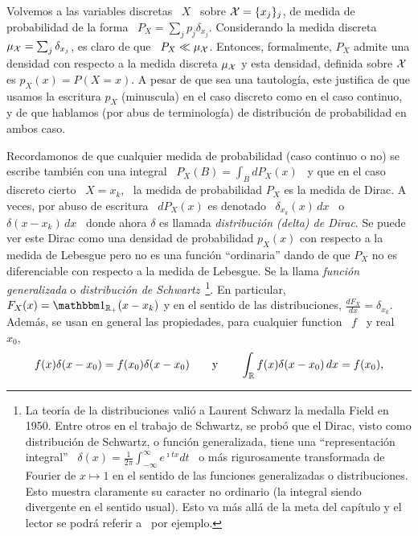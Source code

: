 Volvemos a las variables  discretas \ $X$ \ sobre $\mathcal{X} =  \{ x_j \}_j$, de medida
de probabilidad de la forma \  $P_X = \sum_j p_j \delta_{x_j}$.  Considerando la
medida discreta  \ $\mu_{\mathcal{X}} =  \sum_j \delta_{x_j}$, es  claro de que \  $P_X \ll
\mu_{\mathcal{X}}$.   Entonces, formalmente,  $P_X$ admite  una densidad  con respecto  a la
medida discreta $\mu_{\mathcal{X}}$ y esta densidad, definida sobre $\mathcal{X}$ es $p_X(x) = P(X =
x)$.  A pesar  de que  sea una  tautolog\'ia, este  justifica de  que  usamos la
escritura $p_X$ (minuscula)  en el caso discreto como en el  caso continuo, y de
que hablamos (por  abus de terminolog\'ia) de distribuci\'on  de probabilidad en
ambos caso.\label{Pagina:MP:DensidadDiscreta}

Recordamonos de  que cualquier  medida de probabilidad  (caso continuo o  no) se
escribe tambi\'en con una integral \ $\displaystyle P_X(B) = \int_B dP_X(x)$ \ y
que en el caso discreto cierto \ $X = x_k$, \ la medida de probabilidad $P_X$ es
la medida de  Dirac. A veces, por  abuso de escritura \ $dP_X(x)$  es denotado \
$\delta_{x_k}(x) \,  dx$ \ o \ $\delta(x-x_k)  \, dx$ \ donde  ahora $\delta$ es
llamada {\it distribuci\'on (delta) de Dirac}.  Se puede ver este Dirac como una
densidad de probabilidad $p_X(x)$ con respecto a la medida de Lebesgue pero no es
una funci\'on ``ordinaria'' dando de que $P_X$ no es diferenciable con respecto a
la  medida  de  Lebesgue.  Se  la  llama  {\it  funci\'on generalizada}  o  {\it
  distribuci\'on de Schwartz}~\footnote{La teor\'ia de la distribuciones vali\'o
  a Laurent  Schwarz la  medalla Field en  1950.  Entre  otros en el  trabajo de
  Schwartz, se  prob\'o que el Dirac,  visto como distribuci\'on  de Schwartz, o
  funci\'on   generalizada,   tiene    una   ``representaci\'on   integral''   \
  $\displaystyle \delta(x) =  \frac{1}{2\pi} \int_{-\infty}^{\infty} e^{\imath t
    x} dt$ \  o m\'as rigurosamente transformada de Fourier de  $x \mapsto 1$ en
  el  sentido de  las  funciones generalizadas  o  distribuciones.  Esto  muestra
  claramente  su caracter  no ordinario  (la  integral siendo  divergente en  el
  sentido usual).  Esto va m\'as all\'a de  la meta del cap\'itulo y el lector se
  podr\'a  referir   a~\cite{Sch66,  GelShi64,  GelShi68}   por  ejemplo.}.   En
particular,   $F_X(x)  =   \un_{\Rset_+}(x-x_k)$  y   en  el   sentido   de  las
distribuciones, $\frac{d F_X}{dx} = \delta_{x_k}$.  Adem\'as, se usan en general
las propiedades, para cualquier function \ $f$ \ y real \ $x_0$,
%
\[
f(x) \delta(x-x_0) = f(x_0) \delta(x-x_0) \qquad \mbox{y} \qquad \int_{\mathbb{R}} f(x)
\delta(x-x_0) \, dx = f(x_0),
\]
